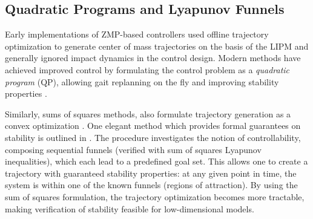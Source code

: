 \subsection{Quadratic Programs and Lyapunov Funnels}


Early implementations of ZMP-based controllers used offline trajectory optimization to generate center of mass trajectories on the basis of the LIPM and generally ignored impact dynamics in the control design. Modern methods have achieved improved control by formulating the control problem as a {\em quadratic program} (QP), allowing gait replanning on the fly and improving stability properties \cite{Kudoh2002,Stephens2010,Herdt2010}.
%

Similarly, sums of squares methods, also formulate trajectory generation as a convex optimization \cite{Tedrake2010}.
%
One elegant method which provides formal guarantees on stability is outlined in \cite{Majumdar2013}.
%
The procedure investigates the notion of controllability, composing sequential funnels (verified with sum of squares Lyapunov inequalities), which each lead to a predefined goal set.
%
This allows one to create a trajectory with guaranteed stability properties: at any given point in time, the system is within one of the known funnels (regions of attraction).
%
By using the sum of squares formulation, the trajectory optimization becomes more tractable, making verification of stability feasible for low-dimensional models.









